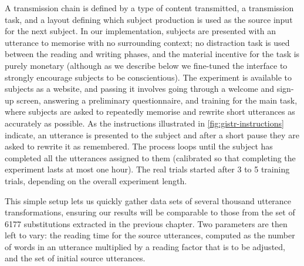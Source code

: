 A transmission chain is defined by a type of content transmitted, a
transmission task, and a layout defining which subject production is
used as the source input for the next subject. In our implementation,
subjects are presented with an utterance to memorise with no surrounding
context; no distraction task is used between the reading and writing
phases, and the material incentive for the task is purely monetary
(although as we describe below we fine-tuned the interface to strongly
encourage subjects to be conscientious). The experiment is available to
subjects as a website, and passing it involves going through a welcome and sign-up screen, answering a preliminary questionnaire, and training for the main task, where subjects are asked to repeatedly
  memorise and rewrite short utterances as accurately as possible.
  As the instructions illustrated in \cref{fig:gistr-instructions}
  indicate, an utterance is presented to the subject and after a short
  pause they are asked to rewrite it as remembered. The process loops
  until the subject has completed all the utterances assigned to them
  (calibrated so that completing the experiment lasts at most one hour).
  The real trials started after 3 to 5 training trials, depending on the
  overall experiment length.

This simple setup lets us quickly gather data sets of several thousand
utterance transformations, ensuring our results will be comparable to
those from the set of \num{6177} substitutions extracted in the previous
chapter. Two parameters are then left to vary: the reading time for the
source utterances, computed as the number of words in an utterance
multiplied by a reading factor that is to be adjusted, and the set of
initial source utterances.

